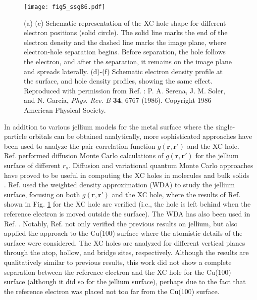 \documentclass[aip, amsmath, amssymb, reprint, longbibliography]{revtex4-2}
\def\mr{\mathbf{r}}
\begin{document}
\begin{figure}[htp]
\centering
\texttt{[image: fig5\_ssg86.pdf]}
\caption{(a)-(c) Schematic representation of the XC hole shape for different electron positions (solid circle). The solid line marks the end of the electron density and the dashed line marks the image plane, where electron-hole separation begins. Before separation, the hole follows the electron, and after the separation, it remains on the image plane and spreads laterally. (d)-(f) Schematic electron density profile at the surface, and hole density profiles, showing the same effect. Reproduced with
permission from Ref. : P. A. Serena, J. M. Soler, and N. Garc\'{i}a, \emph{Phys. Rev. B} \textbf{34}, 6767 (1986). Copyright 1986 American Physical Society.}
\label{fig:ssg86}
\end{figure}

In addition to various jellium models for the metal surface where the single-particle orbitals can be obtained analytically, more sophisticated approaches have been used to analyze the pair correlation function $g(\mr,\mr')$ and the XC hole. Ref.  performed diffusion Monte Carlo calculations of $g(\mr,\mr')$ for the jellium surface of different $r_s$. Diffusion and variational quantum Monte Carlo approaches have proved to be useful in computing the XC holes in molecules \cite{HCL06} and bulk solids \cite{HCWR98,RTC02}. Ref.  used the weighted density approximation (WDA) \cite{GJL79} to study the jellium surface, focusing on both $g(\mr,\mr')$ and the XC hole, where the results of Ref.  shown in Fig. \ref{fig:ssg86} for the XC hole are verified (i.e., the hole is left behind when the reference electron is moved outside the surface). The WDA has also been used in Ref. . Notably, Ref.  not only verified the previous results on jellium, but also applied the approach to the Cu(100) surface where the atomistic details of the surface were considered. The XC holes are analyzed for different vertical planes through the atop, hollow, and bridge sites, respectively. Although the results are qualitatively similar to previous results, this work did not show a complete separation between the reference electron and the XC hole for the Cu(100) surface (although it did so for the jellium surface), perhaps due to the fact that the reference electron was placed not too far from the Cu(100) surface.
\end{document}
